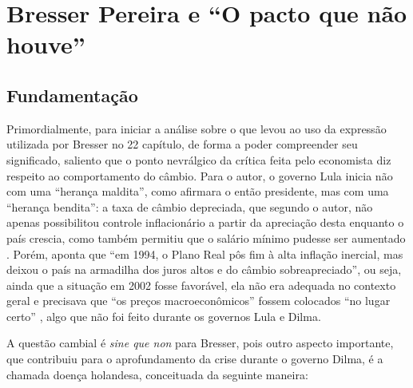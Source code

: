 	
	
	

	\textual
	
	\chapter{Bresser Pereira e ``O pacto que não houve''} \label{bresser}
	
	\section{Fundamentação} \label{fundamentacao}

	Primordialmente, para iniciar a análise sobre o que levou ao uso da expressão utilizada por Bresser no 22{\textordmasculine} capítulo, de forma a poder compreender seu significado, saliento que o ponto nevrálgico da crítica feita pelo economista diz respeito ao comportamento do câmbio. Para o autor, o governo Lula inicia não com uma ``herança maldita'', como afirmara o então presidente, mas com uma ``herança bendita'': a taxa de câmbio depreciada, que segundo o autor, não apenas possibilitou controle inflacionário a partir da apreciação desta enquanto o país crescia, como também permitiu que o salário mínimo pudesse ser aumentado \cite[p. 344]{Bresser2016}. Porém,  aponta que ``em 1994, o Plano Real pôs fim à alta inflação inercial, mas deixou o país na armadilha dos juros altos e do câmbio sobreapreciado'', ou seja, ainda que a situação em 2002 fosse favorável, ela não era adequada no contexto geral e precisava que ``os preços macroeconômicos'' fossem colocados ``no lugar certo'' \cite[p. 361]{Bresser2016}, algo que não foi feito durante os governos Lula e Dilma.

	A questão cambial é \textit{sine que non} para Bresser, pois outro aspecto importante, que contribuiu para o aprofundamento da crise durante o governo Dilma, é a chamada doença holandesa, conceituada da seguinte maneira:
	
